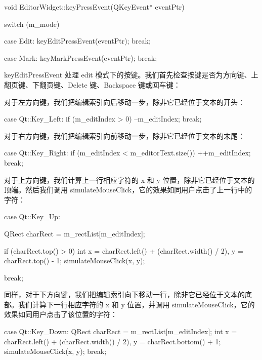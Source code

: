 \begin{codebox}
void EditorWidget::keyPressEvent(QKeyEvent* eventPtr) {
   switch (m_mode) {
     case Edit:
     keyEditPressEvent(eventPtr);
     break;

     case Mark:
     keyMarkPressEvent(eventPtr);
     break;
   }
}
\end{codebox}

keyEditPressEvent 处理 edit 模式下的按键。我们首先检查按键是否为方向键、上翻页键、下翻页键、Delete 键、Backspace 键或回车键：

\begin{codebox}
void EditorWidget::keyEditPressEvent(QKeyEvent* eventPtr) {
  switch (eventPtr->key()) {
\end{codebox}

对于左方向键，我们把编辑索引向后移动一步，除非它已经位于文本的开头：

\begin{codebox}
   case Qt::Key_Left:
     if (m_editIndex > 0) {
        --m_editIndex;
     }
     break;
\end{codebox}

对于右方向键，我们把编辑索引向前移动一步，除非它已经位于文本的末尾：

\begin{codebox}
   case Qt::Key_Right:
    if (m_editIndex < m_editorText.size()) {
      ++m_editIndex;
    }
    break;
\end{codebox}

对于上方向键，我们计算上一行相应字符的 x 和 y 位置，除非它已经位于文本的顶端。然后我们调用 simulateMouseClick，它的效果如同用户点击了上一行中的字符：

\begin{codebox}
   case Qt::Key_Up: {
     QRect charRect = m_rectList[m_editIndex];

     if (charRect.top() > 0) {
       int x = charRect.left() + (charRect.width() / 2),
           y = charRect.top() - 1;
       simulateMouseClick(x, y);
     }
   }
   break;
\end{codebox}

同样，对于下方向键，我们把编辑索引向下移动一行，除非它已经位于文本的底部。我们计算下一行相应字符的 x 和 y 位置，并调用 simulateMouseClick，它的效果如同用户点击了该位置的字符：

\begin{codebox}
   case Qt::Key_Down: {
     QRect charRect = m_rectList[m_editIndex];
     int x = charRect.left() + (charRect.width() / 2),
         y = charRect.bottom() + 1;
     simulateMouseClick(x, y);
   }
   break;
\end{codebox}

